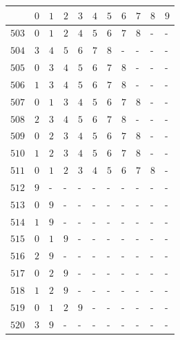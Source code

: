 \begin{appendices}
\begin{table}[H]
  	\label{tab:setbit_17}
  \end{table}
  \begin{table}[H]
  	\centering
  	\begin{tabular} {|l|l|l|l|l|l|l|l|l|l|l|} \hline
  		\backslashbox{$Num$}{$index$} & $ 0 $ & $ 1 $ & $ 2 $ & $ 3 $ & $ 4 $ & $ 5 $ & $ 6 $ & $ 7 $ & $ 8 $ & $ 9 $ \\ \hline
  		$ 503 $ & $ 0 $ &$ 1 $ &$ 2 $ &$ 4 $ &$ 5 $ &$ 6 $ &$ 7 $ &$ 8 $ & - &  -   \\ \hline
  		$ 504 $ & $ 3 $ &$ 4 $ &$ 5 $ &$ 6 $ &$ 7 $ &$ 8 $ & - &  - &  - &  -   \\ \hline
  		$ 505 $ & $ 0 $ &$ 3 $ &$ 4 $ &$ 5 $ &$ 6 $ &$ 7 $ &$ 8 $ & - &  - &  -   \\ \hline
  		$ 506 $ & $ 1 $ &$ 3 $ &$ 4 $ &$ 5 $ &$ 6 $ &$ 7 $ &$ 8 $ & - &  - &  -   \\ \hline
  		$ 507 $ & $ 0 $ &$ 1 $ &$ 3 $ &$ 4 $ &$ 5 $ &$ 6 $ &$ 7 $ &$ 8 $ & - &  -   \\ \hline
  		$ 508 $ & $ 2 $ &$ 3 $ &$ 4 $ &$ 5 $ &$ 6 $ &$ 7 $ &$ 8 $ & - &  - &  -   \\ \hline
  		$ 509 $ & $ 0 $ &$ 2 $ &$ 3 $ &$ 4 $ &$ 5 $ &$ 6 $ &$ 7 $ &$ 8 $ & - &  -   \\ \hline
  		$ 510 $ & $ 1 $ &$ 2 $ &$ 3 $ &$ 4 $ &$ 5 $ &$ 6 $ &$ 7 $ &$ 8 $ & - &  -   \\ \hline
  		$ 511 $ & $ 0 $ &$ 1 $ &$ 2 $ &$ 3 $ &$ 4 $ &$ 5 $ &$ 6 $ &$ 7 $ &$ 8 $ & -   \\ \hline
  		$ 512 $ & $ 9 $ & - &  - &  - &  - &  - &  - &  - &  - &  -   \\ \hline
  		$ 513 $ & $ 0 $ &$ 9 $ & - &  - &  - &  - &  - &  - &  - &  -   \\ \hline
  		$ 514 $ & $ 1 $ &$ 9 $ & - &  - &  - &  - &  - &  - &  - &  -   \\ \hline
  		$ 515 $ & $ 0 $ &$ 1 $ &$ 9 $ & - &  - &  - &  - &  - &  - &  -   \\ \hline
  		$ 516 $ & $ 2 $ &$ 9 $ & - &  - &  - &  - &  - &  - &  - &  -   \\ \hline
  		$ 517 $ & $ 0 $ &$ 2 $ &$ 9 $ & - &  - &  - &  - &  - &  - &  -   \\ \hline
  		$ 518 $ & $ 1 $ &$ 2 $ &$ 9 $ & - &  - &  - &  - &  - &  - &  -   \\ \hline
  		$ 519 $ & $ 0 $ &$ 1 $ &$ 2 $ &$ 9 $ & - &  - &  - &  - &  - &  -   \\ \hline
  		$ 520 $ & $ 3 $ &$ 9 $ & - &  - &  - &  - &  - &  - &  - &  -   \\ \hline

\end{tabular}
\end{table}
\end{appendices}
